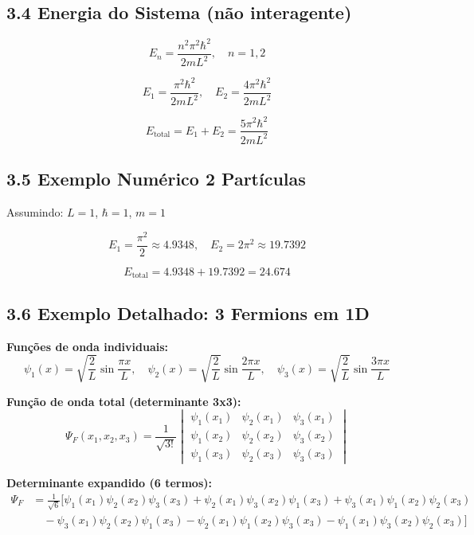 \documentclass[12pt,a4paper]{article}
\begin{document}
\subsection*{3.4 Energia do Sistema (não interagente)}

\[
E_n = \frac{n^2 \pi^2 \hbar^2}{2 m L^2}, \quad n=1,2
\]

\[
E_1 = \frac{\pi^2 \hbar^2}{2 m L^2}, \quad
E_2 = \frac{4 \pi^2 \hbar^2}{2 m L^2}
\]

\[
E_{\text{total}} = E_1 + E_2 = \frac{5 \pi^2 \hbar^2}{2 m L^2}
\]

\subsection*{3.5 Exemplo Numérico 2 Partículas}

Assumindo: \(L=1\), \(\hbar=1\), \(m=1\)

\[
E_1 = \frac{\pi^2}{2} \approx 4.9348, \quad
E_2 = 2 \pi^2 \approx 19.7392
\]

\[
E_{\text{total}} = 4.9348 + 19.7392 = 24.674
\]

\subsection*{3.6 Exemplo Detalhado: 3 Fermions em 1D}

\textbf{Funções de onda individuais:}
\[
\psi_1(x) = \sqrt{\frac{2}{L}} \sin\frac{\pi x}{L}, \quad
\psi_2(x) = \sqrt{\frac{2}{L}} \sin\frac{2 \pi x}{L}, \quad
\psi_3(x) = \sqrt{\frac{2}{L}} \sin\frac{3 \pi x}{L}
\]

\textbf{Função de onda total (determinante 3x3):}
\[
\Psi_F(x_1,x_2,x_3) = \frac{1}{\sqrt{3!}}
\begin{vmatrix}
\psi_1(x_1) & \psi_2(x_1) & \psi_3(x_1) \\
\psi_1(x_2) & \psi_2(x_2) & \psi_3(x_2) \\
\psi_1(x_3) & \psi_2(x_3) & \psi_3(x_3)
\end{vmatrix}
\]

\textbf{Determinante expandido (6 termos):}
\begin{align*}
\Psi_F &= \frac{1}{\sqrt{6}} \Big[
\psi_1(x_1)\psi_2(x_2)\psi_3(x_3) 
+ \psi_2(x_1)\psi_3(x_2)\psi_1(x_3) 
+ \psi_3(x_1)\psi_1(x_2)\psi_2(x_3) \\
&\quad - \psi_3(x_1)\psi_2(x_2)\psi_1(x_3) 
- \psi_2(x_1)\psi_1(x_2)\psi_3(x_3) 
- \psi_1(x_1)\psi_3(x_2)\psi_2(x_3) 
\Big]
\end{align*}
\end{document}
